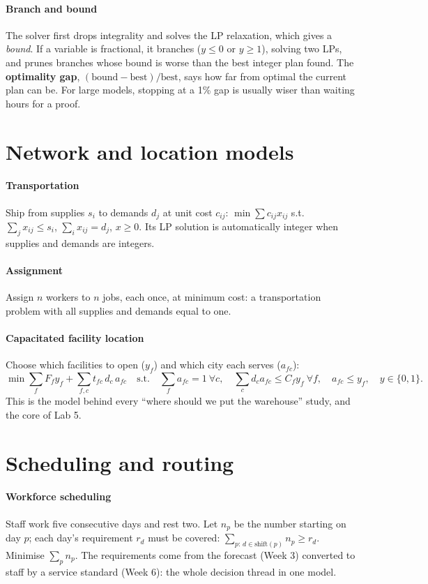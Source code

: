 \paragraph{Branch and bound} The solver first drops integrality and solves the LP relaxation, which gives a
\emph{bound}. If a variable is fractional, it branches ($y\le0$ or $y\ge1$), solving two LPs, and prunes branches whose
bound is worse than the best integer plan found. The \textbf{optimality gap}, $(\text{bound}-\text{best})/\text{best}$,
says how far from optimal the current plan can be. For large models, stopping at a 1\% gap is usually wiser than
waiting hours for a proof.

\section{Network and location models}
\paragraph{Transportation} Ship from supplies $s_i$ to demands $d_j$ at unit cost $c_{ij}$:
$\min\sum c_{ij}x_{ij}$ s.t.\ $\sum_j x_{ij}\le s_i$, $\sum_i x_{ij}=d_j$, $x\ge0$. Its LP solution is automatically
integer when supplies and demands are integers.

\paragraph{Assignment} Assign $n$ workers to $n$ jobs, each once, at minimum cost: a transportation problem with all
supplies and demands equal to one.

\paragraph{Capacitated facility location} Choose which facilities to open ($y_f$) and which city each serves
($a_{fc}$):
\[
\min \sum_f F_f y_f + \sum_{f,c} t_{fc}\,d_c\,a_{fc}
\quad\text{s.t.}\quad \sum_f a_{fc}=1\ \forall c,\quad \sum_c d_c a_{fc}\le C_f y_f\ \forall f,\quad a_{fc}\le y_f,\quad y\in\{0,1\}.
\]
This is the model behind every ``where should we put the warehouse'' study, and the core of Lab 5.

\section{Scheduling and routing}
\paragraph{Workforce scheduling} Staff work five consecutive days and rest two. Let $n_p$ be the number starting on
day $p$; each day's requirement $r_d$ must be covered: $\sum_{p:\,d\in\text{shift}(p)} n_p\ge r_d$. Minimise
$\sum_p n_p$. The requirements come from the forecast (Week 3) converted to staff by a service standard (Week 6):
the whole decision thread in one model.

